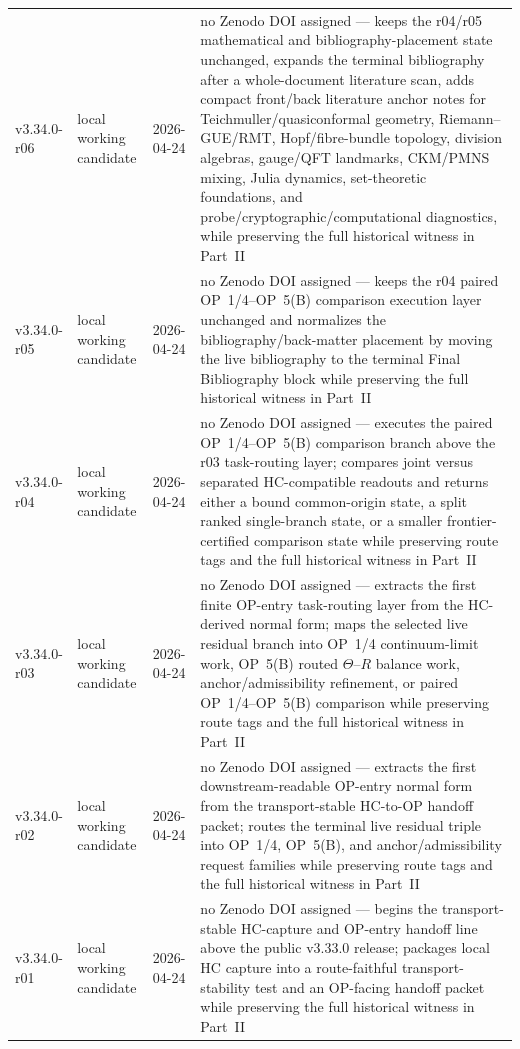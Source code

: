 {\begin{longtable}{|p{}|p{}|p{}|p{}|}
v3.34.0-r06 & local working candidate & 2026-04-24 & no Zenodo DOI assigned --- keeps the r04/r05 mathematical and bibliography-placement state unchanged, expands the terminal bibliography after a whole-document literature scan, adds compact front/back literature anchor notes for Teichmuller/quasiconformal geometry, Riemann--GUE/RMT, Hopf/fibre-bundle topology, division algebras, gauge/QFT landmarks, CKM/PMNS mixing, Julia dynamics, set-theoretic foundations, and probe/cryptographic/computational diagnostics, while preserving the full historical witness in Part~II \\
v3.34.0-r05 & local working candidate & 2026-04-24 & no Zenodo DOI assigned --- keeps the r04 paired OP~1/4--OP~5(B) comparison execution layer unchanged and normalizes the bibliography/back-matter placement by moving the live bibliography to the terminal Final Bibliography block while preserving the full historical witness in Part~II \\
\hline
v3.34.0-r04 & local working candidate & 2026-04-24 & no Zenodo DOI assigned --- executes the paired OP~1/4--OP~5(B) comparison branch above the r03 task-routing layer; compares joint versus separated HC-compatible readouts and returns either a bound common-origin state, a split ranked single-branch state, or a smaller frontier-certified comparison state while preserving route tags and the full historical witness in Part~II \\
\hline
v3.34.0-r03 & local working candidate & 2026-04-24 & no Zenodo DOI assigned --- extracts the first finite OP-entry task-routing layer from the HC-derived normal form; maps the selected live residual branch into OP~1/4 continuum-limit work, OP~5(B) routed $\Theta$--$R$ balance work, anchor/admissibility refinement, or paired OP~1/4--OP~5(B) comparison while preserving route tags and the full historical witness in Part~II \\
\hline
v3.34.0-r02 & local working candidate & 2026-04-24 & no Zenodo DOI assigned --- extracts the first downstream-readable OP-entry normal form from the transport-stable HC-to-OP handoff packet; routes the terminal live residual triple into OP~1/4, OP~5(B), and anchor/admissibility request families while preserving route tags and the full historical witness in Part~II \\
\hline
v3.34.0-r01 & local working candidate & 2026-04-24 & no Zenodo DOI assigned --- begins the transport-stable HC-capture and OP-entry handoff line above the public v3.33.0 release; packages local HC capture into a route-faithful transport-stability test and an OP-facing handoff packet while preserving the full historical witness in Part~II \\

\end{longtable}}
